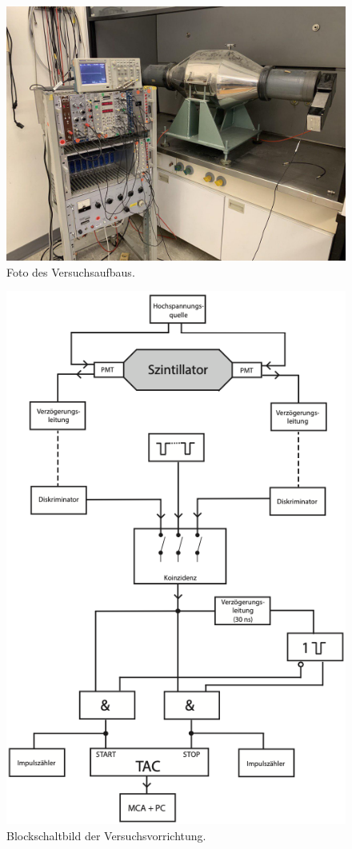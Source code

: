 \begin{figure}
    \centering
    \includegraphics[width=0.7\linewidth]{figures/Aufbau_Foto.jpg}
    \caption{Foto des Versuchsaufbaus.}
    \label{fig:Aufbau_Foto}
\end{figure}
\FloatBarrier
\begin{figure}
    \centering
    \includegraphics[width=0.7\linewidth]{figures/Aufbau.png}
    \caption{Blockschaltbild der Versuchsvorrichtung. \cite{V01}}
    \label{fig:Aufbau}
\end{figure}
\FloatBarrier


